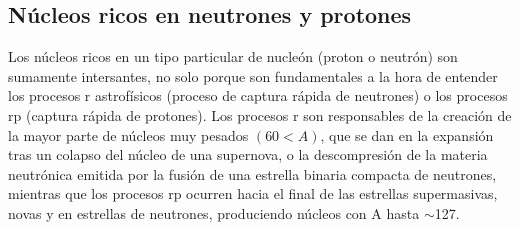 \begin{minipage}{0.3\linewidth}
    \centering
    \label{fig:02-modelo_capas}
\end{minipage}
\vspace{0.9em}



\subsection{Núcleos ricos en neutrones y protones}

Los núcleos ricos en un tipo particular de nucleón (proton o neutrón) son sumamente intersantes, no solo porque son fundamentales a la hora de entender los procesos r astrofísicos \cite{THIELEMANN2011346} (proceso de captura rápida de neutrones) o los procesos rp (captura rápida de protones). Los procesos r son responsables  de la creación de la mayor parte de núcleos muy pesados $(60<A)$, que se dan en la expansión tras un colapso del núcleo de una supernova, o la descompresión de la materia neutrónica emitida por la fusión de una estrella binaria compacta de neutrones, mientras que los procesos rp ocurren hacia el final de las estrellas supermasivas, novas y en estrellas de neutrones, produciendo núcleos con A hasta $\sim$127. 

